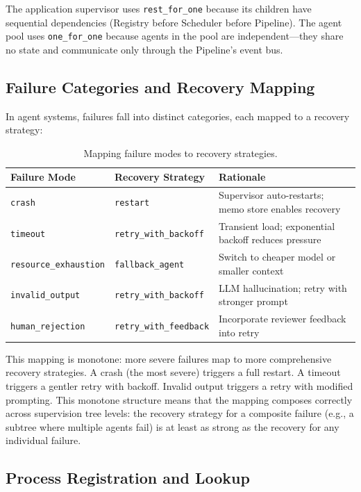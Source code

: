 \documentclass[12pt,a4paper]{article}
\theoremstyle{definition}
\theoremstyle{remark}
\begin{document}
The application supervisor uses \texttt{rest\_for\_one} because its children have sequential dependencies (Registry before Scheduler before Pipeline). The agent pool uses \texttt{one\_for\_one} because agents in the pool are independent---they share no state and communicate only through the Pipeline's event bus.

\subsection{Failure Categories and Recovery Mapping}

In agent systems, failures fall into distinct categories, each mapped to a recovery strategy:

\begin{table}[H]
\centering
\begin{tabular}{@{}lll@{}}
\toprule
\textbf{Failure Mode} & \textbf{Recovery Strategy} & \textbf{Rationale} \\
\midrule
\texttt{crash} & \texttt{restart} & Supervisor auto-restarts; memo store enables recovery \\
\texttt{timeout} & \texttt{retry\_with\_backoff} & Transient load; exponential backoff reduces pressure \\
\texttt{resource\_exhaustion} & \texttt{fallback\_agent} & Switch to cheaper model or smaller context \\
\texttt{invalid\_output} & \texttt{retry\_with\_backoff} & LLM hallucination; retry with stronger prompt \\
\texttt{human\_rejection} & \texttt{retry\_with\_feedback} & Incorporate reviewer feedback into retry \\
\bottomrule
\end{tabular}
\caption{Mapping failure modes to recovery strategies.}\label{tab:failure-recovery}
\end{table}

This mapping is monotone: more severe failures map to more comprehensive recovery strategies. A crash (the most severe) triggers a full restart. A timeout triggers a gentler retry with backoff. Invalid output triggers a retry with modified prompting. This monotone structure means that the mapping composes correctly across supervision tree levels: the recovery strategy for a composite failure (e.g., a subtree where multiple agents fail) is at least as strong as the recovery for any individual failure.

\subsection{Process Registration and Lookup}
\end{document}

